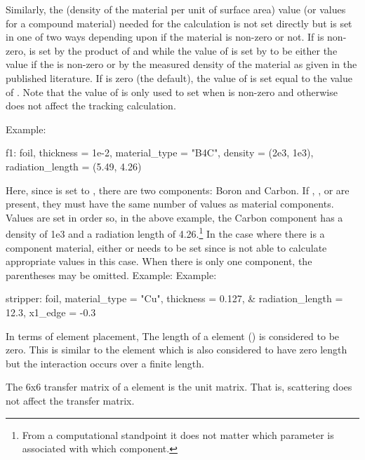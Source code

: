Similarly, the  (density of the material per unit of surface area) value (or
values for a compound material) needed for the calculation is not set directly but is set in one of
two ways depending upon if the material  is non-zero or not. If  is
non-zero,  is set by the product of  and  while
the value of  is set by \bmad to be either the value  if the
 is non-zero or by the measured density of the material as given in the published
literature. If  is zero (the default), the value of  is set
equal to the value of . Note that the value of  is only used to
set  when  is non-zero and otherwise does not affect the
tracking calculation.

Example:
\begin{example}
  f1: foil, thickness = 1e-2, material_type = "B4C", 
          density = (2e3, 1e3), radiation_length = (5.49, 4.26)
\end{example}
Here, since  is set to , there are two components: Boron and Carbon. If
, , or  are present, they must have the same
number of values as material components. Values are set in order so, in the above example, the
Carbon component has a density of 1e3 and a radiation length of 4.26.\footnote
  {
From a computational standpoint it does not matter which parameter is associated with which component.
  }
In the case where there is a component material, either  or  needs to
be set since \bmad is not able to calculate appropriate values in this case. When there is only one
component, the parentheses may be omitted. Example:
Example:
\begin{example}
  stripper: foil, material_type = "Cu", thickness = 0.127, &
                                  radiation_length = 12.3, x1_edge = -0.3
\end{example}

In terms of element placement, The length of a  element () is considered to be
zero.  This is similar to the  element which is also considered to have zero length but
the interaction occurs over a finite length.

The 6x6 transfer matrix of a  element is the unit matrix. That is, scattering does
not affect the transfer matrix.

